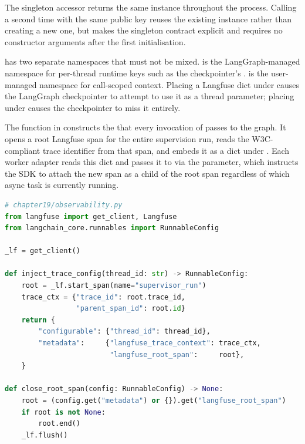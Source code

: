 The singleton accessor  returns the same
 instance throughout the process. Calling
 a second time with the same public key reuses the
existing instance rather than creating a new one, but 
makes the singleton contract explicit and requires no constructor
arguments after the first initialisation.

\begin{notebox}
 has two separate namespaces that must not be mixed.
 is the LangGraph-managed namespace for
per-thread runtime keys such as the checkpointer's .
 is the user-managed namespace for call-scoped
context. Placing a Langfuse  dict under
 causes the LangGraph checkpointer to attempt to use
it as a thread parameter; placing  under
 causes the checkpointer to miss it entirely.
\end{notebox}

The  function in 
constructs the  that every invocation of
 passes to the graph. It opens a root Langfuse span
for the entire supervision run, reads the W3C-compliant trace identifier
from that span, and embeds it as a  dict under
. Each worker adapter reads this dict and passes
it to  via the 
parameter, which instructs the SDK to attach the new span as a child of
the root span regardless of which async task is currently running.

\begin{lstlisting}[language=Python,
  caption={Langfuse SDK v3 root span, worker span, and config injection},
  label={lst:sup-langfuse}]
# chapter19/observability.py
from langfuse import get_client, Langfuse
from langchain_core.runnables import RunnableConfig

_lf = get_client()

def inject_trace_config(thread_id: str) -> RunnableConfig:
    root = _lf.start_span(name="supervisor_run")
    trace_ctx = {"trace_id": root.trace_id,
                 "parent_span_id": root.id}
    return {
        "configurable": {"thread_id": thread_id},
        "metadata":     {"langfuse_trace_context": trace_ctx,
                         "langfuse_root_span":     root},
    }

def close_root_span(config: RunnableConfig) -> None:
    root = (config.get("metadata") or {}).get("langfuse_root_span")
    if root is not None:
        root.end()
    _lf.flush()
\end{lstlisting}

